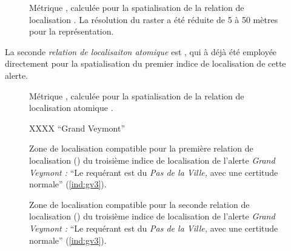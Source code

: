\begin{figure}
  \centering
  
  \caption{Métrique \protect{}, calculée
    pour la spatialisation de la relation de localisation
    \protect{}. La résolution du raster a
    été réduite de 5 à 50 mètres pour la représentation.}
  \label{fig:veyont_EcartNord}
\end{figure}

La seconde \emph{relation de localisaiton atomique} est
, qui à déjà été employée
directement pour la spatialisation du premier indice de localisation
de cette alerte.

\begin{figure}
  \centering
  
  \caption{Métrique \protect{}, calculée pour la
    spatialisation de la relation de localisation atomique
    \protect{}.}
  \label{fig:veyont_distance}
\end{figure}

%   


\begin{figure}
  \centering
  
  \caption{XXXX \enquote{Grand Veymont}}
  \label{fig:fuzzy_veyont_angleNord}
\end{figure}


\begin{figure}
  \centering
  
  \caption{Zone de localisation compatible pour la première relation
    de localisation (\protect{}) du troisième
    indice de localisation de l'alerte \emph{Grand Veymont :}
    \enquote{Le requérant est
      \protect{} du \emph{Pas de la
        Ville,} avec une certitude normale} (\ref{ind:gv3}).}
  \label{fig:ZLC_Nord_Pas_Ville}
\end{figure}


\begin{figure}
  \centering
  
  \caption{Zone de localisation compatible pour la seconde relation de
    localisation (\protect{})
    du troisième indice de localisation de l'alerte \emph{Grand
      Veymont :} \enquote{Le requérant est
      \protect{} du \emph{Pas de la
        Ville,} avec une certitude normale} (\ref{ind:gv3}).}
  \label{fig:ZLC_Ext_Pas_Ville}
\end{figure}

